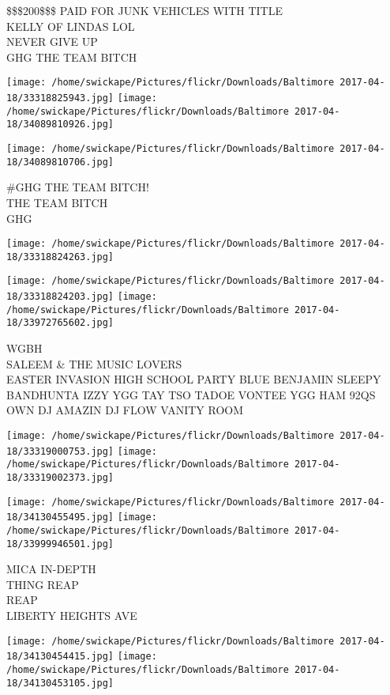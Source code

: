 \documentclass[10pt,letterpaper]{article}
\begin{document}
\$\$\$200\$\$\$ PAID FOR JUNK VEHICLES WITH TITLE\\
KELLY OF LINDAS LOL\\
NEVER GIVE UP\\
GHG THE TEAM BITCH\\
\pagebreak

\texttt{[image: /home/swickape/Pictures/flickr/Downloads/Baltimore 2017-04-18/33318825943.jpg]}
\texttt{[image: /home/swickape/Pictures/flickr/Downloads/Baltimore 2017-04-18/34089810926.jpg]}

\texttt{[image: /home/swickape/Pictures/flickr/Downloads/Baltimore 2017-04-18/34089810706.jpg]}

\#GHG THE TEAM BITCH!\\
THE TEAM BITCH\\
GHG\\
\pagebreak

\texttt{[image: /home/swickape/Pictures/flickr/Downloads/Baltimore 2017-04-18/33318824263.jpg]}

\vspace{0.25in}
\texttt{[image: /home/swickape/Pictures/flickr/Downloads/Baltimore 2017-04-18/33318824203.jpg]}
\texttt{[image: /home/swickape/Pictures/flickr/Downloads/Baltimore 2017-04-18/33972765602.jpg]}

WGBH\\
SALEEM \& THE MUSIC LOVERS\\
EASTER INVASION HIGH SCHOOL PARTY BLUE BENJAMIN SLEEPY BANDHUNTA IZZY YGG TAY TSO TADOE VONTEE YGG HAM 92QS OWN DJ AMAZIN DJ FLOW VANITY ROOM\\
\pagebreak

\texttt{[image: /home/swickape/Pictures/flickr/Downloads/Baltimore 2017-04-18/33319000753.jpg]}
\texttt{[image: /home/swickape/Pictures/flickr/Downloads/Baltimore 2017-04-18/33319002373.jpg]}

\texttt{[image: /home/swickape/Pictures/flickr/Downloads/Baltimore 2017-04-18/34130455495.jpg]}
\texttt{[image: /home/swickape/Pictures/flickr/Downloads/Baltimore 2017-04-18/33999946501.jpg]}

MICA IN{-}DEPTH\\
THING REAP\\
REAP\\
LIBERTY HEIGHTS AVE\\
\pagebreak

\texttt{[image: /home/swickape/Pictures/flickr/Downloads/Baltimore 2017-04-18/34130454415.jpg]}
\texttt{[image: /home/swickape/Pictures/flickr/Downloads/Baltimore 2017-04-18/34130453105.jpg]}
\end{document}
